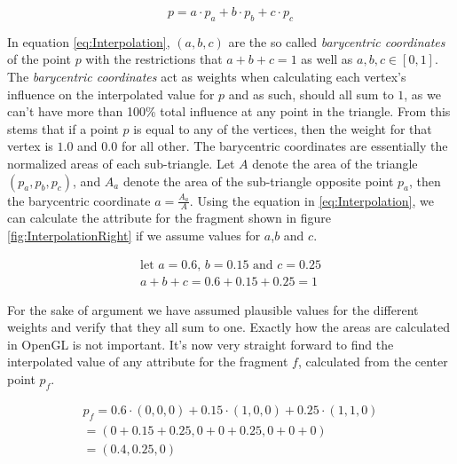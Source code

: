 \begin{equation}\label{eq:Interpolation}
    p = a \cdot p_a + b \cdot p_b + c \cdot p_c
\end{equation}

In equation \ref{eq:Interpolation}, $(a,b,c)$ are the so called \textit{barycentric coordinates} of the point $p$ with the restrictions that $a+b+c = 1$ as well as $a,b,c \in [0,1]$. The \textit{barycentric coordinates} act as weights when calculating each vertex's influence on the interpolated value for $p$ and as such, should all sum to $1$, as we can't have more than 100\% total influence at any point in the triangle. From this stems that if a point $p$ is equal to any of the vertices, then the weight for that vertex is $1.0$ and $0.0$ for all other. The barycentric coordinates are essentially the normalized areas of each sub-triangle. Let $A$ denote the area of the triangle $(p_a,p_b,p_c)$, and $A_a$ denote the area of the sub-triangle opposite point $p_a$, then the barycentric coordinate $a = \frac{A_a}{A}$. Using the equation in \ref{eq:Interpolation}, we can calculate the attribute  for the fragment shown in figure \ref{fig:InterpolationRight} if we assume values for $a$,$b$ and $c$.

\begin{equation*}
    \begin{aligned}
    \text{let } a = 0.6 \text{, } b = 0.15 \text{ and } c = 0.25\\
    a + b + c = 0.6 + 0.15 + 0.25 = 1
    \end{aligned}
\end{equation*}

For the sake of argument we have assumed plausible values for the different weights and verify that they all sum to one. Exactly how the areas are calculated in OpenGL is not important. It's now very straight forward to find the interpolated value of any attribute for the fragment $f$, calculated from the center point $p_f$.

\begin{equation*}
    \begin{aligned}
        p_f = 0.6 \cdot (0,0,0) + 0.15 \cdot (1,0,0) + 0.25\cdot (1,1,0) \\
        = (0+0.15+0.25, 0+0+0.25, 0+0+0) \\
        = (0.4, 0.25, 0)
    \end{aligned}
\end{equation*}

